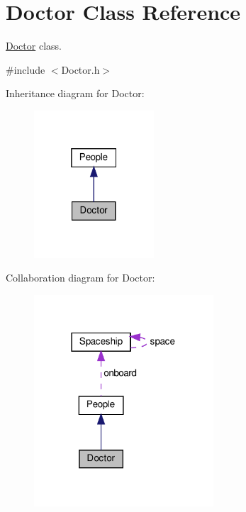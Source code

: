 \hypertarget{classDoctor}{}\section{Doctor Class Reference}
\label{classDoctor}


\hyperlink{classDoctor}{Doctor} class.  




{\ttfamily \#include $<$Doctor.\+h$>$}



Inheritance diagram for Doctor\+:\nopagebreak
\begin{figure}[H]
\begin{center}
\leavevmode
\includegraphics[width=127pt]{classDoctor__inherit__graph}
\end{center}
\end{figure}


Collaboration diagram for Doctor\+:\nopagebreak
\begin{figure}[H]
\begin{center}
\leavevmode
\includegraphics[width=190pt]{classDoctor__coll__graph}
\end{center}
\end{figure}
